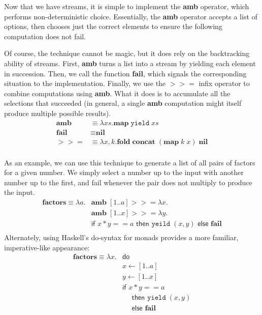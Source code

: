 \documentclass[11pt]{article}
\newcommand\x{\lambda x}
\begin{document}
Now that we have streams, it is simple to implement the \textbf{amb} operator, which performs non-deterministic choice.
Essentially, the \textbf{amb} operator accepts a list of options, then chooses just the correct elements to ensure the following computation does not fail.

Of course, the technique cannot be magic, but it does rely on the backtracking ability of streams.
First, \textbf{amb} turns a list into a stream by yielding each element in succession.
Then, we call the function \textbf{fail}, which signals the corresponding situation to the implementation.
Finally, we use the $>\!>=$ infix operator to combine computations using \textbf{amb}.
What it does is to accumulate all the selections that succeeded (in general, a single \textbf{amb} computation might itself produce multiple possible results).
\begin{align*}
\textbf{amb} &\equiv \x s. \textbf{map}\;\texttt{yield}\;xs \\
\textbf{fail} &\equiv \textbf{nil} \\
>\!>= &\equiv \lambda x,k. \textbf{fold}\;\textbf{concat}\;(\textbf{map}\;k\;x)\;\textbf{nil} \\
\end{align*}

As an example, we can use this technique to generate a list of all pairs of factors for a given number.
We simply select a number up to the input with another number up to the first, and fail whenever the pair does not multiply to produce the input.
\begin{align*}
\textbf{factors} \equiv \lambda a. &\textbf{amb}\;[1..a] >\!>= \x. \\
                              &\textbf{amb}\;[1..x] >\!>= \lambda y. \\
                              &\textsf{if }x*y == a
                               \textsf{ then }\texttt{yeild}\;(x, y)
                               \textsf{ else }\textbf{fail} \\
\end{align*}
Alternately, using Haskell's do-syntax for monads provides a more familiar, imperative-like appearance:
\begin{align*}
\textbf{factors} \equiv \lambda x. &\textsf{do} \\
& x \leftarrow [1..a] \\
& y \leftarrow [1..x] \\
& \textsf{if }x*y == a \\
&\quad \textsf{ then }\texttt{yield}\;(x, y) \\
&\quad \textsf{ else }\textbf{fail} \\
\end{align*}
\end{document}
